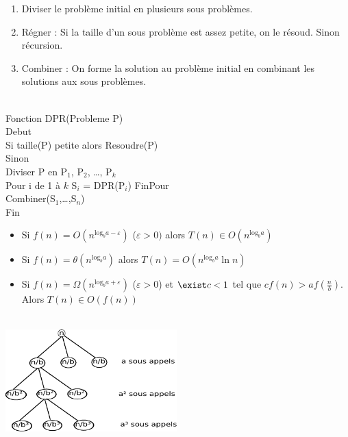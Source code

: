 \begin{enumerate}
	\item Diviser le problème initial en plusieurs sous problèmes.
	\item Régner : Si la taille d'un sous problème est assez petite, on le résoud. Sinon récursion.
	\item Combiner : On forme la solution au problème initial en combinant les solutions aux sous problèmes.
\end{enumerate}

\\
Fonction DPR(Probleme P)\\
Debut\\
	\hspace*{1cm} Si taille(P) petite alors Resoudre(P)\\
	\hspace*{1cm} Sinon \\
		\hspace*{2cm} Diviser P en P$_1$, P$_2$, \ldots, P$_k$ \\
		\hspace*{2cm} Pour i de 1 à $k$ S$_i$ = DPR(P$_i$) FinPour \\
		\hspace*{2cm} Combiner(S$_1$,\ldots,S$_n$)\\
Fin\\

\begin{itemize}
	\item Si $f(n) = O(n^{\mathrm{log}_ba-\varepsilon})$ ($\varepsilon > 0)$ alors $T(n)\in O(n^{\mathrm{log}_ba})$
	\item Si $f(n) = \theta(n^{\mathrm{log}_ba})$ alors $T(n) = O(n^{\mathrm{log}_ba}\ln n)$
	\item Si $f(n) = \Omega(n^{\mathrm{log}_ba+\varepsilon})$ ($\varepsilon > 0$) et $\exist c < 1$ tel que $cf(n) > af(\frac{n}{b})$. Alors $T(n) \in O(f(n))$
\end{itemize}

\newpage

\\

\includegraphics[width=250px]{Images/03_arbreDR.pdf}\\

